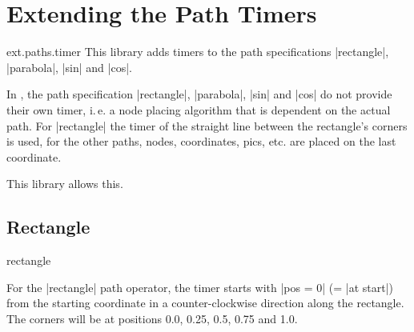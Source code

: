 %
%
%

\section{Extending the Path Timers}
\label{library:timer}

\begin{tikzlibrary}{ext.paths.timer}
  This library adds timers to the path specifications |rectangle|, |parabola|, |sin| and |cos|.
\end{tikzlibrary}

In \tikzname, the path specification |rectangle|, |parabola|, |sin| and |cos| do not provide
their own timer, i.\,e. a node placing algorithm that is dependent on the actual path.
For |rectangle| the timer of the straight line between the rectangle's corners is used, for
the other paths, nodes, coordinates, pics, etc. are placed on the last coordinate.

This library allows this.

\subsection{Rectangle}
\begin{pathoperation'}{rectangle}{}\end{pathoperation'}

For the |rectangle| path operator, the timer starts with |pos = 0| (= |at start|) from
the starting coordinate in a counter-clockwise direction along the rectangle.
The corners will be at positions 0.0, 0.25, 0.5, 0.75 and 1.0.

\begin{codeexample}[width=10cm,preamble=\usetikzlibrary{ext.paths.timer}]
\end{codeexample}

